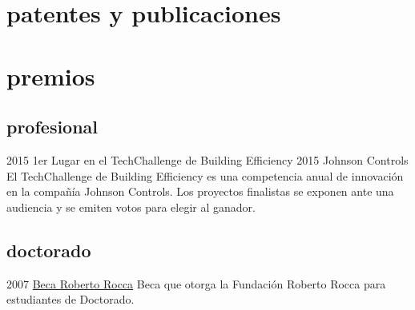 \documentclass[]{friggeri-cv} %
\begin{document}
\section{patentes y publicaciones}





\section{premios}

\subsection{profesional}

\begin{entrylist}


\entry
{2015}
{1er Lugar en el TechChallenge de Building Efficiency 2015}
{Johnson Controls}
{El TechChallenge de Building Efficiency es una competencia anual de innovación en la compañía Johnson Controls. Los proyectos finalistas se exponen ante una audiencia y se emiten votos para elegir al ganador.}

\end{entrylist}

\subsection{doctorado}


\begin{entrylist}

\entry
{2007}
{\href{http://www.robertorocca.org/en/fellowships/fellows07.aspx}{Beca Roberto Rocca}}
{}
{Beca que otorga la Fundación Roberto Rocca para estudiantes de Doctorado.}
\end{entrylist}

\newpage
\end{document}
